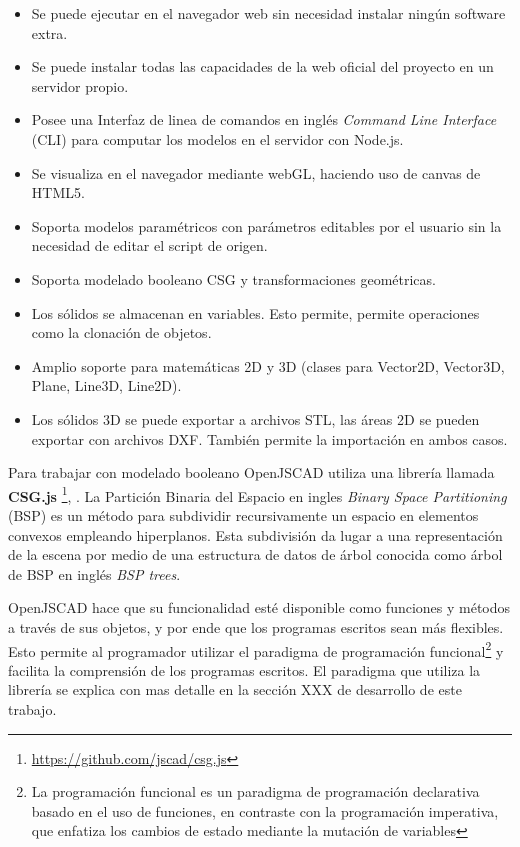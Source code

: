 \begin{itemize}
    \item Se puede ejecutar en el navegador web sin necesidad instalar ningún software extra.
    \item Se puede instalar todas las capacidades de la web oficial del proyecto en un servidor propio.
    \item Posee una Interfaz de linea de comandos en inglés \textit{Command Line Interface} (CLI) para computar los modelos en el servidor con Node.js.
    \item Se visualiza en el navegador mediante webGL, haciendo uso de canvas de HTML5.
    \item Soporta modelos paramétricos con parámetros editables por el usuario sin la necesidad de editar el script de origen.
    \item Soporta modelado booleano CSG y transformaciones geométricas.
    \item Los sólidos se almacenan en variables. Esto permite, permite operaciones como la clonación de objetos.
    \item Amplio soporte para matemáticas 2D y 3D (clases para Vector2D, Vector3D, Plane, Line3D, Line2D).
    \item Los sólidos 3D se puede exportar a archivos STL, las áreas 2D se pueden exportar con archivos DXF. También permite la importación en ambos casos.
\end{itemize}

Para trabajar con modelado booleano OpenJSCAD utiliza una librería llamada \textbf{CSG.js} \footnote{\url{https://github.com/jscad/csg.js}},  \citep{Nieuwenhuijse}.
La Partición Binaria del Espacio en ingles \textit{Binary Space Partitioning} (BSP) es un método para subdividir recursivamente un espacio en elementos convexos empleando hiperplanos. Esta subdivisión da lugar a una representación de la escena por medio de una estructura de datos de árbol conocida como árbol de BSP en inglés \textit{BSP trees}. 

OpenJSCAD hace que su funcionalidad esté disponible como funciones y métodos a través de sus objetos, y por ende que los programas escritos sean más flexibles. Esto permite al programador utilizar el paradigma de programación funcional\footnote{La programación funcional es un paradigma de programación declarativa basado en el uso de funciones, en contraste con la programación imperativa, que enfatiza los cambios de estado mediante la mutación de variables} y facilita la comprensión de los programas escritos. El paradigma que utiliza la librería se explica con mas detalle en la sección XXX de desarrollo de este trabajo.

